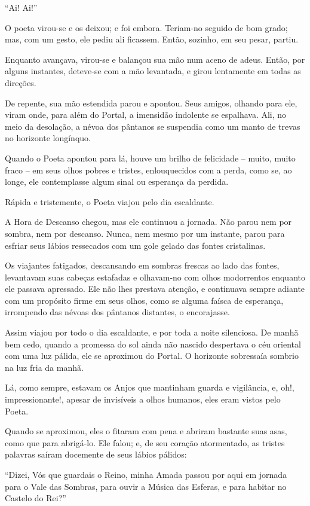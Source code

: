 ``Ai! Ai!''

O poeta virou-se e os deixou; e foi embora. Teriam-no seguido de bom
grado; mas, com um gesto, ele pediu ali ficassem. Então, sozinho, em seu
pesar, partiu.

Enquanto avançava, virou-se e balançou sua mão num aceno de adeus.
Então, por alguns instantes, deteve-se com a mão levantada, e girou
lentamente em todas as direções.

De repente, sua mão estendida parou e apontou. Seus amigos, olhando para
ele, viram onde, para além do Portal, a imensidão indolente se espalhava.
Ali, no meio da desolação, a névoa dos pântanos se suspendia como um
manto de trevas no horizonte longínquo.

Quando o Poeta apontou para lá, houve um brilho de felicidade -- muito,
muito fraco -- em seus olhos pobres e tristes, enlouquecidos com a
perda, como se, ao longe, ele contemplasse algum sinal ou esperança da
perdida.

Rápida e tristemente, o Poeta viajou pelo dia escaldante.

A Hora de Descanso chegou, mas ele continuou a jornada. Não parou nem
por sombra, nem por descanso. Nunca, nem mesmo por um instante, parou
para esfriar seus lábios ressecados com um gole gelado das fontes
cristalinas.

Os viajantes fatigados, descansando em sombras frescas ao lado das
fontes, levantavam suas cabeças estafadas e olhavam-no com olhos
modorrentos enquanto ele passava apressado. Ele não lhes prestava
atenção, e continuava sempre adiante com um propósito firme em seus
olhos, como se alguma faísca de esperança, irrompendo das névoas dos
pântanos distantes, o encorajasse.

Assim viajou por todo o dia escaldante, e por toda a noite silenciosa.
De manhã bem cedo, quando a promessa do sol ainda não nascido despertava
o céu oriental com uma luz pálida, ele se aproximou do Portal. O
horizonte sobressaía sombrio na luz fria da manhã.

Lá, como sempre, estavam os Anjos que mantinham guarda e vigilância, e,
oh!, impressionante!, apesar de invisíveis a olhos humanos, eles eram
vistos pelo Poeta.

Quando se aproximou, eles o fitaram com pena e abriram bastante suas
asas, como que para abrigá-lo. Ele falou; e, de seu coração atormentado,
as tristes palavras saíram docemente de seus lábios pálidos:

``Dizei, Vós que guardais o Reino, minha Amada passou por aqui em
jornada para o Vale das Sombras, para ouvir a Música das Esferas, e para
habitar no Castelo do Rei?''


